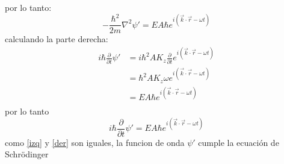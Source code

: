 \documentclass[12pt,letterpaper]{report}
\begin{document}
por lo tanto:
\begin{equation}
    -\frac{\hbar^2}{2m} \nabla^2 \psi'=E A\hbar e^{i(\vec{k}\cdot \vec{r}-\omega t)}
    \label{izq}
\end{equation}
calculando la parte derecha: 
\begin{align*}
i\hbar \frac{\partial }{\partial t} \psi'   &= i\hbar^2 AK_z  \frac{\partial }{\partial t}e^{i(\vec{k}\cdot \vec{r}-\omega t)}\\
                                            &= \hbar^2 A K_z \omega e^{i(\vec{k}\cdot \vec{r}-\omega t)}\\
                                            &= E A\hbar e^{i(\vec{k}\cdot \vec{r}-\omega t)}\\
\end{align*}
por lo tanto
\begin{equation}
    i\hbar \frac{\partial }{\partial t} \psi' =  E A\hbar e^{i(\vec{k}\cdot \vec{r}-\omega t)}
    \label{der}
\end{equation}
como \ref{izq} y \ref{der} son iguales, la funcion de onda $\psi'$ cumple la ecuación de Schr\"odinger
\end{document}
